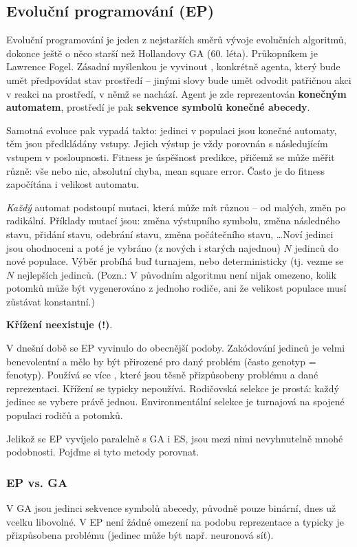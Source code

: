 \subsection{Evoluční programování (EP)}
Evoluční programování je jeden z nejstarších směrů vývoje evolučních algoritmů, dokonce ještě o něco starší než Hollandovy GA (60. léta). Průkopníkem je Lawrence Fogel. Zásadní myšlenkou je vyvinout , konkrétně agenta, který bude umět předpovídat stav prostředí -- jinými slovy bude umět odvodit patřičnou akci v reakci na prostředí, v němž se nachází. Agent je zde reprezentován \textbf{konečným automatem}, prostředí je pak \textbf{sekvence symbolů konečné abecedy}.

Samotná evoluce pak vypadá takto: jedinci v populaci jsou konečné automaty, těm jsou předkládány vstupy. Jejich výstup je vždy porovnán s následujícím vstupem v posloupnosti. Fitness je úspěšnost predikce, přičemž se může měřit různě: vše nebo nic, absolutní chyba, mean square error. Často je do fitness započítána i velikost automatu.

\textit{Každý} automat podstoupí mutaci, která může mít různou  -- od malých,  změn po radikální. Příklady mutací jsou: změna výstupního symbolu, změna následného stavu, přidání stavu, odebrání stavu, změna počátečního stavu, \dots Noví jedinci jsou ohodnoceni a poté je vybráno (z nových i starých najednou) $N$ jedinců do nové populace. Výběr probíhá buď turnajem, nebo deterministicky (tj. vezme se $N$ nejlepších jedinců. (Pozn.: V původním algoritmu není nijak omezeno, kolik potomků může být vygenerováno z jednoho rodiče, ani že velikost populace musí zůstávat konstantní.)

\textbf{Křížení neexistuje (!)}. 

V dnešní době se EP vyvinulo do obecnější podoby. Zakódování jedinců je velmi benevolentní a mělo by být přirozené pro daný problém (často genotyp = fenotyp). Používá se více , které jsou těsně přizpůsobeny problému a dané reprezentaci. Křížení se typicky nepoužívá. Rodičovská selekce je prostá: každý jedinec se vybere právě jednou. Environmentální selekce je turnajová na spojené populaci rodičů a potomků.

Jelikož se EP vyvíjelo paralelně s GA i ES, jsou mezi nimi nevyhnutelně mnohé podobnosti. Pojďme si tyto metody porovnat.

\subsubsection{EP vs. GA}
V GA jsou jedinci sekvence symbolů abecedy, původně pouze binární, dnes už vcelku libovolné. V EP není žádné omezení na podobu reprezentace a typicky je přizpůsobena problému (jedinec může být např. neuronová síť). 


